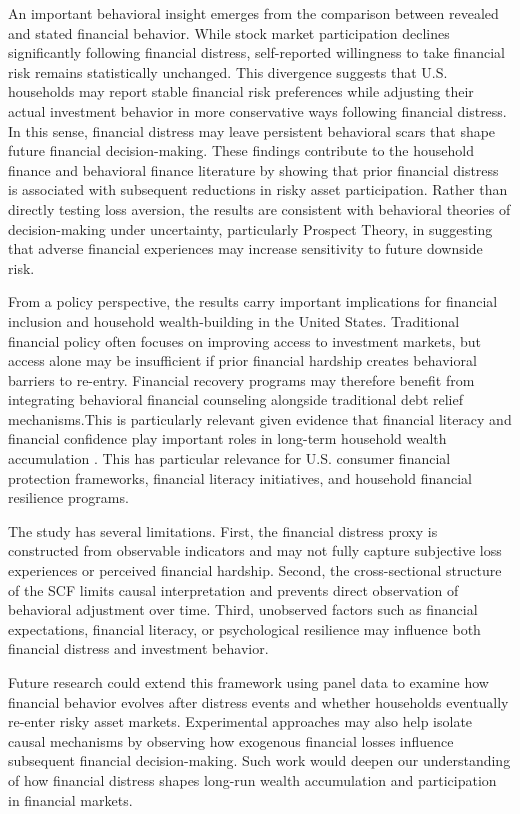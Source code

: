 \documentclass[12pt]{article}
\begin{document}
\medskip
An important behavioral insight emerges from the comparison between revealed and stated financial behavior. While stock market participation declines significantly following financial distress, self-reported willingness to take financial risk remains statistically unchanged. This divergence suggests that U.S. households may report stable financial risk preferences while adjusting their actual investment behavior in more conservative ways following financial distress. In this sense, financial distress may leave persistent behavioral scars that shape future financial decision-making. These findings contribute to the household finance and behavioral finance literature by showing that prior financial distress is associated with subsequent reductions in risky asset participation. Rather than directly testing loss aversion, the results are consistent with behavioral theories of decision-making under uncertainty, particularly Prospect Theory, in suggesting that adverse financial experiences may increase sensitivity to future downside risk.

\medskip
From a policy perspective, the results carry important implications for financial inclusion and household wealth-building in the United States. Traditional financial policy often focuses on improving access to investment markets, but access alone may be insufficient if prior financial hardship creates behavioral barriers to re-entry. Financial recovery programs may therefore benefit from integrating behavioral financial counseling alongside traditional debt relief mechanisms.This is particularly relevant given evidence that financial literacy and financial confidence play important roles in long-term household wealth accumulation \cite{lusardi2014economic}. This has particular relevance for U.S. consumer financial protection frameworks, financial literacy initiatives, and household financial resilience programs.

\medskip
The study has several limitations. First, the financial distress proxy is constructed from observable indicators and may not fully capture subjective loss experiences or perceived financial hardship. Second, the cross-sectional structure of the SCF limits causal interpretation and prevents direct observation of behavioral adjustment over time. Third, unobserved factors such as financial expectations, financial literacy, or psychological resilience may influence both financial distress and investment behavior.

\medskip
Future research could extend this framework using panel data to examine how financial behavior evolves after distress events and whether households eventually re-enter risky asset markets. Experimental approaches may also help isolate causal mechanisms by observing how exogenous financial losses influence subsequent financial decision-making. Such work would deepen our understanding of how financial distress shapes long-run wealth accumulation and participation in financial markets.
\end{document}

